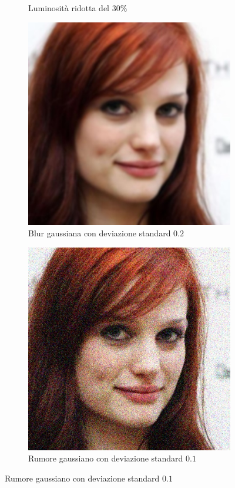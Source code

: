 \begin{figure}[h]
\begin{subfigure}{0.2\textwidth}
\caption{Luminosità ridotta del $30\%$}
\label{sfig:corruption_brightness}
\end{subfigure}\hfill
\begin{subfigure}{0.2\textwidth}
\includegraphics[width=\textwidth]{./Images/gaussian_blur_severity_2.0.jpg}
\caption{Blur gaussiana con deviazione standard $0.2$}
\label{sfig:corruption_gaussian_blur}
\end{subfigure}\hfill
\begin{subfigure}{0.2\textwidth}
\includegraphics[width=\textwidth]{./Images/gaussian_noise_severity_0.1.jpg}
\caption{Rumore gaussiano con deviazione standard $0.1$}
\label{sfig:corruption_gaussian_noise}
\end{subfigure}\hfill


\end{figure}
